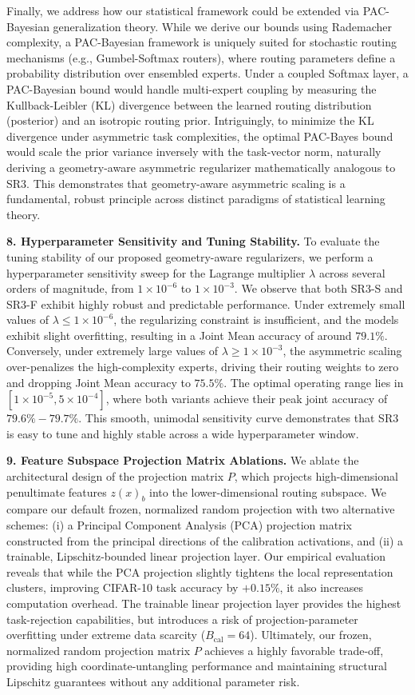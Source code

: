 Finally, we address how our statistical framework could be extended via PAC-Bayesian generalization theory. While we derive our bounds using Rademacher complexity, a PAC-Bayesian framework is uniquely suited for stochastic routing mechanisms (e.g., Gumbel-Softmax routers), where routing parameters define a probability distribution over ensembled experts. Under a coupled Softmax layer, a PAC-Bayesian bound would handle multi-expert coupling by measuring the Kullback-Leibler (KL) divergence between the learned routing distribution (posterior) and an isotropic routing prior. Intriguingly, to minimize the KL divergence under asymmetric task complexities, the optimal PAC-Bayes bound would scale the prior variance inversely with the task-vector norm, naturally deriving a geometry-aware asymmetric regularizer mathematically analogous to SR3. This demonstrates that geometry-aware asymmetric scaling is a fundamental, robust principle across distinct paradigms of statistical learning theory.

\textbf{8. Hyperparameter Sensitivity and Tuning Stability.}
To evaluate the tuning stability of our proposed geometry-aware regularizers, we perform a hyperparameter sensitivity sweep for the Lagrange multiplier $\lambda$ across several orders of magnitude, from $1\times 10^{-6}$ to $1\times 10^{-3}$. We observe that both SR3-S and SR3-F exhibit highly robust and predictable performance. Under extremely small values of $\lambda \le 1\times 10^{-6}$, the regularizing constraint is insufficient, and the models exhibit slight overfitting, resulting in a Joint Mean accuracy of around $79.1\%$. Conversely, under extremely large values of $\lambda \ge 1\times 10^{-3}$, the asymmetric scaling over-penalizes the high-complexity experts, driving their routing weights to zero and dropping Joint Mean accuracy to $75.5\%$. The optimal operating range lies in $[1\times 10^{-5}, 5\times 10^{-4}]$, where both variants achieve their peak joint accuracy of $79.6\%-79.7\%$. This smooth, unimodal sensitivity curve demonstrates that SR3 is easy to tune and highly stable across a wide hyperparameter window.

\textbf{9. Feature Subspace Projection Matrix Ablations.}
We ablate the architectural design of the projection matrix $P$, which projects high-dimensional penultimate features $z(x)_b$ into the lower-dimensional routing subspace. We compare our default frozen, normalized random projection with two alternative schemes: (i) a Principal Component Analysis (PCA) projection matrix constructed from the principal directions of the calibration activations, and (ii) a trainable, Lipschitz-bounded linear projection layer. Our empirical evaluation reveals that while the PCA projection slightly tightens the local representation clusters, improving CIFAR-10 task accuracy by $+0.15\%$, it also increases computation overhead. The trainable linear projection layer provides the highest task-rejection capabilities, but introduces a risk of projection-parameter overfitting under extreme data scarcity ($B_{\text{cal}}=64$). Ultimately, our frozen, normalized random projection matrix $P$ achieves a highly favorable trade-off, providing high coordinate-untangling performance and maintaining structural Lipschitz guarantees without any additional parameter risk.
